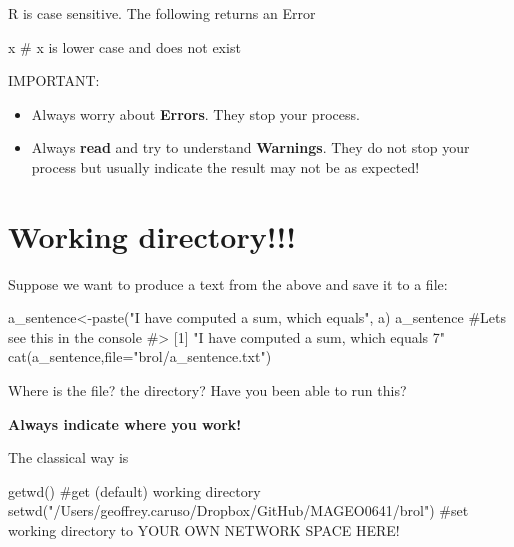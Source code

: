 \documentclass[
  letterpaper,
  DIV=11,
  numbers=noendperiod]{scrreprt}
\newenvironment{Shaded}{\begin{snugshade}}{\end{snugshade}}
\newcommand{\AttributeTok}[1]{\textcolor[rgb]{0.40,0.45,0.13}{#1}}
\newcommand{\CommentTok}[1]{\textcolor[rgb]{0.37,0.37,0.37}{#1}}
\newcommand{\FunctionTok}[1]{\textcolor[rgb]{0.28,0.35,0.67}{#1}}
\newcommand{\NormalTok}[1]{\textcolor[rgb]{0.00,0.23,0.31}{#1}}
\newcommand{\OtherTok}[1]{\textcolor[rgb]{0.00,0.23,0.31}{#1}}
\newcommand{\StringTok}[1]{\textcolor[rgb]{0.13,0.47,0.30}{#1}}
\begin{document}
R is case sensitive. The following returns an Error

\begin{Shaded}
\begin{Highlighting}[]
\NormalTok{x }\CommentTok{\# x is lower case and does not exist}
\end{Highlighting}
\end{Shaded}

IMPORTANT:

\begin{itemize}
\item
  Always worry about \textbf{Errors}. They stop your process.
\item
  Always \textbf{read} and try to understand \textbf{Warnings}. They do
  not stop your process but usually indicate the result may not be as
  expected!
\end{itemize}

\section{Working directory!!!}\label{working-directory}

Suppose we want to produce a text from the above and save it to a file:

\begin{Shaded}
\begin{Highlighting}[]
\NormalTok{a\_sentence}\OtherTok{\textless{}{-}}\FunctionTok{paste}\NormalTok{(}\StringTok{"I have computed a sum, which equals"}\NormalTok{, a)}
\NormalTok{a\_sentence }\CommentTok{\#Let\textquotesingle{}s see this in the console}
\CommentTok{\#\textgreater{} [1] "I have computed a sum, which equals 7"}
\FunctionTok{cat}\NormalTok{(a\_sentence,}\AttributeTok{file=}\StringTok{"brol/a\_sentence.txt"}\NormalTok{)}
\end{Highlighting}
\end{Shaded}

Where is the file? the directory? Have you been able to run this?

\textbf{Always indicate where you work!}

The classical way is

\begin{Shaded}
\begin{Highlighting}[]
\FunctionTok{getwd}\NormalTok{() }\CommentTok{\#get (default) working directory}
\FunctionTok{setwd}\NormalTok{(}\StringTok{"/Users/geoffrey.caruso/Dropbox/GitHub/MAGEO0641/brol"}\NormalTok{) }\CommentTok{\#set working directory to YOUR OWN NETWORK SPACE HERE!}
\end{Highlighting}
\end{Shaded}
\end{document}
